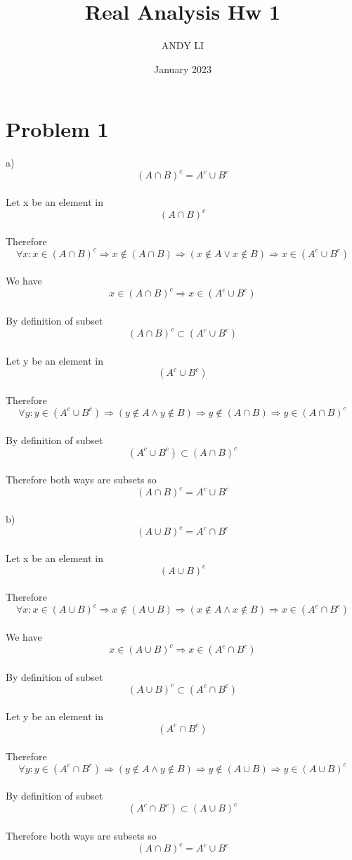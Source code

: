 \documentclass{article}
\title{Real Analysis Hw 1}
\author{ANDY LI}
\date{January 2023}
\begin{document}
\maketitle

\section{Problem 1}
a) $$(A \cap B)^c = A^c \cup B^c$$
\\Let x be an element in $$(A \cap B)^c$$
\\Therefore $$\forall x:  x \in (A \cap B)^c \Rightarrow x \notin (A \cap B) 
\Rightarrow (x \notin A \lor x \notin B) \Rightarrow x \in (A^c \cup B^c)$$
\\We have $$x \in (A \cap B)^c \Rightarrow x \in (A^c \cup B^c)$$
\\By definition of subset $$(A \cap B)^c \subset (A^c \cup B^c)$$
\\Let y be an element in $$(A^c \cup B^c)$$
\\Therefore $$\forall y:  y \in (A^c \cup B^c) \Rightarrow (y \notin A \wedge y \notin B) \Rightarrow y \notin (A \cap B) \Rightarrow y \in (A \cap B)^c$$
\\By definition of subset $$(A^c \cup B^c) \subset (A \cap B)^c$$
\\Therefore both ways are subsets so $$(A \cap B)^c = A^c \cup B^c$$
\\b) $$(A \cup B)^c = A^c \cap B^c$$
\\Let x be an element in $$(A \cup B)^c$$
\\Therefore $$\forall x:  x \in (A \cup B)^c \Rightarrow x \notin (A \cup B) 
\Rightarrow (x \notin A \wedge x \notin B) \Rightarrow x \in (A^c \cap B^c)$$
\\We have $$x \in (A \cup B)^c \Rightarrow x \in (A^c \cap B^c)$$
\\By definition of subset $$(A \cup B)^c \subset (A^c \cap B^c)$$
\\Let y be an element in $$(A^c \cap B^c)$$
\\Therefore $$\forall y:  y \in (A^c \cap B^c) \Rightarrow (y \notin A \wedge y \notin B) \Rightarrow y \notin (A \cup B) \Rightarrow y \in (A \cup B)^c$$
\\By definition of subset $$(A^c \cap B^c) \subset (A \cup B)^c$$
\\Therefore both ways are subsets so $$(A \cap B)^c = A^c \cup B^c$$
\\
\end{document}

